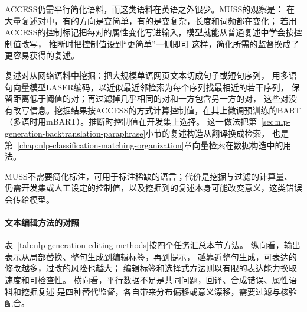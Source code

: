 ACCESS仍需平行简化语料，而这类语料在英语之外很少。MUSS的观察是：
在大量复述对中，有的方向是变简单，有的是变复杂，长度和词频都在变化；
若用ACCESS的控制标记把每对的属性变化写进输入，模型就能从普通复述中学会按控制值改写，
推断时把控制值设到“更简单”一侧即可
这样，简化所需的监督换成了更容易获得的复述。

复述对从网络语料中挖掘：把大规模单语网页文本切成句子或短句序列，
用多语句向量模型LASER编码，以近似最近邻检索为每个序列找最相近的若干序列，
保留距离低于阈值的对；再过滤掉几乎相同的对和一方包含另一方的对，
这些对没有改写信息。挖掘结果按ACCESS的方式计算控制值，在其上微调预训练的BART
（多语时用mBART）。推断时控制值在开发集上选择。
这一做法把第~\ref{sec:nlp-generation-backtranslation-paraphrase}小节的复述构造从翻译换成检索，
也是第~\ref{chap:nlp-classification-matching-organization}章向量检索在数据构造中的用法。

MUSS不需要简化标注，可用于标注稀缺的语言；代价是挖掘与过滤的计算量、
仍需开发集或人工设定的控制值，以及挖掘到的复述本身可能改变意义，这类错误会传给模型。

\paragraph{文本编辑方法的对照}
表~\ref{tab:nlp-generation-editing-methods}按四个任务汇总本节方法。
纵向看，输出表示从局部替换、整句生成到编辑标签，再到提示，
越靠近整句生成，可表达的修改越多，过改的风险也越大；
编辑标签和选择式方法则以有限的表达能力换取速度和可检查性。
横向看，平行数据不足是共同问题，回译、合成错误、属性语料和挖掘复述
是四种替代监督，各自带来分布偏移或意义漂移，需要过滤与核验配合。

